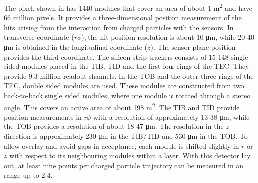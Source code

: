  
 The pixel, shown in  has 1440 modules that cover an area of about 1 \si{ \square \meter} and have 66 million pixels. It provides a three-dimensional position measurement of the hits arising from the interaction from charged particles with the sensors. In transverse coordinate ($r\phi$), the hit position resolution is about 10 \si{ \micro \meter}, while 20-40 \si{ \micro \meter} is obtained in the longitudinal coordinate ($z$). The sensor plane position provides the third coordinate. 
  The silicon strip trackers consists of 15 148 single sided modules placed in the TIB, TID and the first four rings of the TEC. They provide 9.3 million readout channels. In the TOB and the outer three rings of the TEC, double sided modules are used. These modules are constructed from two back-to-back single sided modules, where one module is rotated through a stereo angle.  This covers an active area of about 198 \si{ \square  \meter}. The TIB and TID provide position measurements in $r\phi$ with a resolution of approximately 13-38 \si{ \micro \meter}, while the TOB provides a resolution of about 18-47 \si{ \micro \meter}. The resolution in the  $z$ direction is approximately 230  \si{ \micro \meter} in the TIB/TID and 530  \si{ \micro \meter} in the TOB. To allow overlay and avoid gaps in acceptance, each module is shifted slightly in $r$ or $z$ with respect to its neighbouring modules within a layer.  With this detector lay out, at least nine points per charged particle trajectory can be measured in an \abspsrap range up to 2.4.
  
